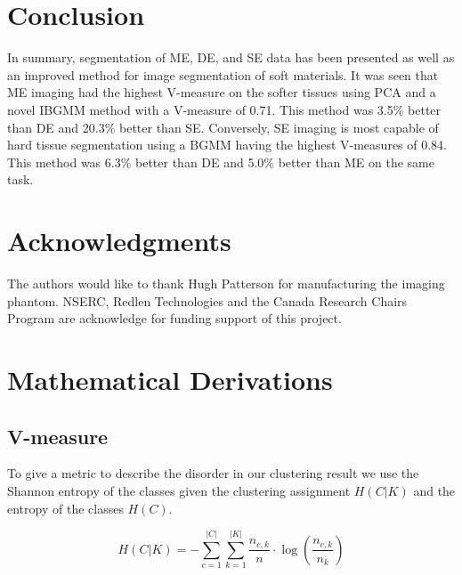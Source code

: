 \documentclass[a4paper,11pt]{article}
\begin{document}
\section{Conclusion}

In summary, segmentation of ME, DE, and SE data has been presented as well as an improved method for image segmentation of soft materials. It was seen that ME imaging had the highest V-measure on the softer tissues using PCA and a novel IBGMM method with a V-measure of 0.71. This method was 3.5\% better than DE and 20.3\% better than SE. Conversely, SE imaging is most capable of hard tissue segmentation using a BGMM having the highest V-measures of 0.84. This method was 6.3\% better than DE and 5.0\% better than ME on the same task.


\section*{Acknowledgments}

The authors would like to thank Hugh Patterson for manufacturing the imaging phantom. NSERC, Redlen Technologies and the Canada Research Chairs Program are acknowledge for funding support of this project.

\appendix{}
\section{Mathematical Derivations}

\subsection{V-measure}

To give a metric to describe the disorder in our clustering result we use the Shannon entropy of the classes given the clustering assignment $H(C|K)$ and the entropy of the classes  $H(C)$.

\begin{equation}
H(C|K) = - \sum_{c=1}^{|C|} \sum_{k=1}^{|K|} \frac{n_{c,k}}{n}
\cdot \log\left(\frac{n_{c,k}}{n_k}\right)
\end{equation}
\end{document}
